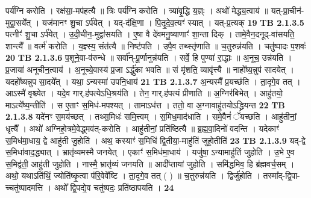 \documentclass[17pt]{extarticle}
\begin{document}
                  पर्य॑ग्नि करोति । रक्ष॑सा॒-मप॑हत्यै ॥ त्रिः पर्य॑ग्नि करोति । त्र्या॑वृ॒द्धि य॒ज्ञ्ः । अथो॑ मेद्ध्य॒त्वाय॑ ॥ यत्-प्रा॒चीन॑-मुद्वा॒सये᳚त् । यज॑मानꣳ शु॒चा ऽर्प॑येत् । यद्-द॑क्षि॒णा । पि॒तृ॒दे॒व॒त्यꣳ॑ स्यात् । यत्-प्र॒त्यक् \textbf{ 19} \newline
                  \newline
                                \textbf{ TB 2.1.3.5} \newline
                  पत्नीꣳ॑ शु॒चा ऽर्प॑येत् । उ॒दी॒चीन॒-मुद्वा॑सयति । ए॒षा वै दे॑वमनु॒ष्याणाꣳ॑ शा॒न्ता दिक् । तामे॒वैन॒दनूद्-वा॑सयति॒ शान्त्यै᳚ ॥ वर्त्म॑ करोति । य॒ज्ञ्स्य॒ संत॑त्यै ॥ निष्ट॑पति । उपै॒व तथ्स्तृ॑णाति ॥ च॒तुरुन्न॑यति । चतु॑ष्पादः प॒शवः॑ \textbf{ 20} \newline
                  \newline
                                \textbf{ TB 2.1.3.6} \newline
                  प॒शूने॒वा-व॑रुन्धे ॥ सर्वा᳚न्-पू॒र्णानुन्न॑यति । सर्वे॒ हि पुण्या॑ रा॒द्धाः ॥ अ॒नूच॒ उन्न॑यति । प्र॒जाया॑ अनूचीन॒त्वाय॑ । अ॒नूच्ये॒वास्य॑ प्र॒जा ऽर्द्धु॑का भवति ॥ सं मृ॑शति॒ व्यावृ॑त्त्यै ॥ नाहो᳚ष्य॒न्नुप॑ सादयेत् । यदहो᳚ष्यन्नुप सा॒दये᳚त् । यथा॒ ऽन्यस्मा॑ उपनि॒धाय॑ \textbf{ 21} \newline
                  \newline
                                \textbf{ TB 2.1.3.7} \newline
                  अ॒न्यस्मै᳚ प्र॒यच्छ॑ति । ता॒दृगे॒व तत् । आऽस्मै॑ वृश्च्येत । यदे॒व गार्.ह॑पत्येऽधि॒श्रय॑ति । तेन॒ गार्.ह॑पत्यं प्रीणाति ॥ अ॒ग्निर॑बिभेत् । आहु॑तयो॒ माऽत्ये᳚ष्य॒न्तीति॑ । स ए॒ताꣳ स॒मिध॑-मपश्यत् । तामाऽध॑त्त । ततो॒ वा अ॒ग्नावाहु॑तयोऽद्ध्रियन्त \textbf{ 22} \newline
                  \newline
                                \textbf{ TB 2.1.3.8} \newline
                  यदे॑नꣳ स॒मय॑च्छत् । तथ्स॒मिधः॑ समि॒त्त्वम् । स॒मिध॒माद॑धाति । समे॒वैनं॑ ॅयच्छति । आहु॑तीनां॒ धृत्यै᳚ । अथो॑ अग्निहो॒त्रमे॒वेद्ध्मव॑त्-करोति । आहु॑तीनां॒ प्रति॑ष्ठित्यै ॥ ब्र॒ह्म॒वा॒दिनो॑ वदन्ति । यदेकाꣳ॑ स॒मिध॑मा॒धाय॒ द्वे आहु॑ती जु॒होति॑ । अथ॒ कस्याꣳ॑ स॒मिधि॑ द्वि॒तीया॒-माहु॑तिं जुहो॒तीति॑ \textbf{ 23} \newline
                  \newline
                                \textbf{ TB 2.1.3.9} \newline
                  यद्-द्वे स॒मिधा॑वाद॒द्ध्यात् । भ्रातृ॑व्यमस्मै जनयेत् । एकाꣳ॑ स॒मिध॑मा॒धाय॑ । यजु॑षा॒ ऽन्यामाहु॑तिं जुहोति । उ॒भे ए॒व स॒मिद्व॑ती॒ आहु॑ती जुहोति । नास्मै॒ भ्रातृ॑व्यं जनयति ॥ आदी᳚प्तायां जुहोति । समि॑द्धमिव॒ हि ब्र॑ह्मवर्च॒सम् । अथो॒ यथाऽति॑थिं॒ ज्योति॑ष्कृ॒त्वा प॑रि॒वेवे᳚ष्टि । ता॒दृगे॒व तत् ( ) ॥ च॒तुरुन्न॑यति । द्विर्जु॑होति । तस्मा᳚द्-द्वि॒पा-च्चतु॑ष्पादमत्ति । अथो᳚ द्वि॒पद्ये॒व चतु॑ष्पदः॒ प्रति॑ष्ठापयति । \textbf{ 24} \newline
\end{document}
